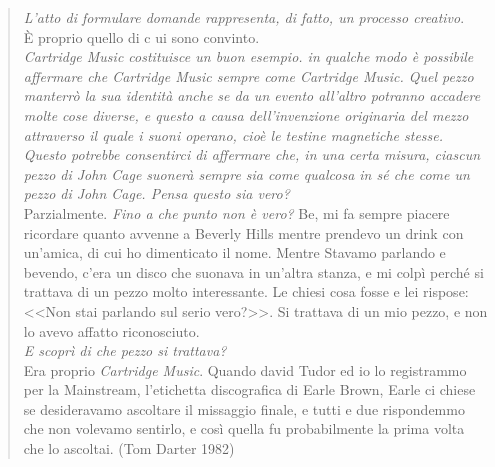 \begin{multicols}{2}
\begin{quote}
	\emph{L'atto di formulare domande rappresenta, di fatto, un processo creativo}.\\
	È proprio quello di c ui sono convinto.\\
	\emph{\emph{Cartridge Music} costituisce un buon esempio. in qualche modo è possibile affermare che \emph{Cartridge Music} sempre come \emph{Cartridge Music}. Quel pezzo manterrò la sua identità anche se da un evento all'altro potranno accadere molte cose diverse, e questo a causa dell'invenzione originaria del mezzo attraverso il quale i suoni operano, cioè le testine magnetiche stesse. Questo potrebbe consentirci di affermare che, in una certa misura, ciascun pezzo di John Cage suonerà sempre sia come qualcosa in sé che come un pezzo di John Cage. Pensa questo sia vero?} \\
	Parzialmente.
	\emph{Fino a che punto non è vero?}
	Be, mi fa sempre piacere ricordare quanto avvenne a Beverly Hills mentre prendevo un drink con un'amica, di cui ho dimenticato il nome. Mentre Stavamo parlando e bevendo, c'era un disco che suonava in un'altra stanza, e mi colpì perché si trattava di un pezzo molto interessante. Le chiesi cosa fosse e lei rispose: <<Non stai parlando sul serio vero?>>. Si trattava di un mio pezzo, e non lo avevo affatto riconosciuto.\\
	\emph{E scoprì di che pezzo si trattava?}\\
	Era proprio \emph{Cartridge Music}. Quando david Tudor ed io lo registrammo per la Mainstream, l'etichetta discografica di Earle Brown, Earle ci chiese se desideravamo ascoltare il missaggio finale, e tutti e due rispondemmo che non volevamo sentirlo, e così quella fu probabilmente la prima volta che lo ascoltai. (Tom Darter 1982)

\end{quote}




\end{multicols}
